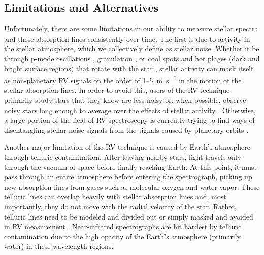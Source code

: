 \subsection{Limitations and Alternatives}

Unfortunately, there are some limitations in our ability to measure stellar spectra and these absorption lines consistently over time. The first is due to activity in the stellar atmosphere, which we collectively define as stellar noise. Whether it be through p-mode oscillations \citep[large-scale pressure changes;][]{kjeldsen_amplitudes_1995}, granulation \citep[small cells of convective motion;][]{moro_solar_2004}, or cool spots and hot plages (dark and bright surface regions) that rotate with the star \citep{saar_activity-related_1997}, stellar activity can mask itself as non-planetary RV signals on the order of 1--5~\si{\meter\per\second} in the motion of the stellar absorption lines. In order to avoid this, users of the RV technique primarily study stars that they know are less noisy or, when possible, observe noisy stars long enough to average over the effects of stellar activity  \citep{lovis_radial_2011}. Otherwise, a large portion of the field of RV spectroscopy is currently trying to find ways of disentangling stellar noise signals from the signals caused by planetary orbits \citep[e.g.][]{davis_insights_2017, dumusque_measuring_2018}.

Another major limitation of the RV technique is caused by Earth's atmosphere through telluric contamination. After leaving nearby stars, light travels only through the vacuum of space before finally reaching Earth. At this point, it must pass through an entire atmosphere before entering the spectrograph, picking up new absorption lines from gases such as molecular oxygen and water vapor. These telluric lines can overlap heavily with stellar absorption lines and, most importantly, they do not move with the radial velocity of the star. Rather, telluric lines need to be modeled and divided out or simply masked and avoided in RV measurement \citep[e.g.][]{smette_molecfit_2015, kausch_molecfit_2015, bedell_wobble_2019, leet_toward_2019}. Near-infrared spectrographs are hit hardest by telluric contamination due to the high opacity of the Earth's atmosphere (primarily water) in these wavelength regions.

